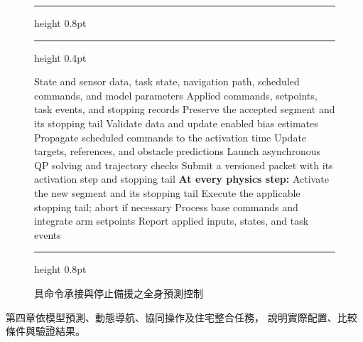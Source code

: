 \begin{figure}[!p]
\begin{lrbox}{\chThreeWorkflowAlgorithmBox}
\begin{minipage}{\linewidth}
    \vspace{0.5\baselineskip}
\begin{algorithm}[H]
    \ifdefined\RawFloats\RawFloats\fi
    \fontsize{11pt}{13pt}\selectfont
    \setlength{\abovecaptionskip}{3pt}
    \setlength{\belowcaptionskip}{3pt}
    \hrule height 0.8pt\relax
    \caption{具命令承接與停止備援之全身預測控制}
    \label{alg:wholebody_predictive_control}
    \par\vspace{2pt}
    \hrule height 0.4pt\relax
    \vspace{4pt}
    \begin{algorithmic}[1]
        \Require State and sensor data, task state, navigation path,
                 scheduled commands, and model parameters
        \Ensure Applied commands, setpoints, task events, and stopping records
        \State Preserve the accepted segment and its stopping tail
                \State Validate data and update enabled bias estimates
                \State Propagate scheduled commands to the activation time
                \State Update targets, references, and obstacle predictions
                \State Launch asynchronous QP solving and trajectory checks
            \EndIf
                \State Submit a versioned packet with its activation step and stopping tail
            \EndIf
            \Statex \textbf{At every physics step:}
                \State Activate the new segment and its stopping tail
                \State Execute the applicable stopping tail; abort if necessary
            \EndIf
            \State Process base commands and integrate arm setpoints
            \State Report applied inputs, states, and task events
        \EndWhile
    \end{algorithmic}
    \par\vspace{4pt}
    \hrule height 0.8pt\relax
\end{algorithm}
    \end{minipage}
    \end{lrbox}
    \ifdim\dimexpr\ht\chThreeWorkflowAlgorithmBox+\dp\chThreeWorkflowAlgorithmBox\relax>0.98\textheight
        \resizebox*{!}{0.98\textheight}{\usebox{\chThreeWorkflowAlgorithmBox}}
    \else
        \usebox{\chThreeWorkflowAlgorithmBox}
    \fi
\end{figure}

第四章依模型預測、動態導航、協同操作及住宅整合任務，
說明實際配置、比較條件與驗證結果。
